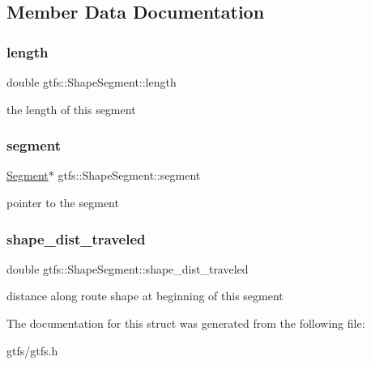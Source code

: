 \subsection{Member Data Documentation}
\mbox{\label{structgtfs_1_1ShapeSegment_ac1ec581b6fa1a1dec3f442cd592bfccb}} 
\subsubsection{\texorpdfstring{length}{length}}
{\footnotesize\ttfamily double gtfs\+::\+Shape\+Segment\+::length}

the length of this segment \mbox{\label{structgtfs_1_1ShapeSegment_a30eb5db589498e40bb110402314a602b}} 
\subsubsection{\texorpdfstring{segment}{segment}}
{\footnotesize\ttfamily \hyperlink{classgtfs_1_1Segment}{Segment}$\ast$ gtfs\+::\+Shape\+Segment\+::segment}

pointer to the segment \mbox{\label{structgtfs_1_1ShapeSegment_a64afdd03235b9bc256fc18652c6f9c47}} 
\subsubsection{\texorpdfstring{shape\+\_\+dist\+\_\+traveled}{shape\_dist\_traveled}}
{\footnotesize\ttfamily double gtfs\+::\+Shape\+Segment\+::shape\+\_\+dist\+\_\+traveled}

distance along route shape at beginning of this segment 

The documentation for this struct was generated from the following file\+:\begin{DoxyCompactItemize}
\item 
gtfs/gtfs.\+h\end{DoxyCompactItemize}
